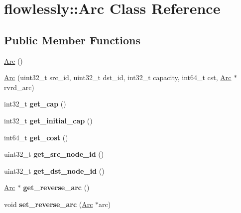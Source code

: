 \hypertarget{classflowlessly_1_1Arc}{\section{flowlessly\-:\-:\-Arc \-Class \-Reference}
\label{classflowlessly_1_1Arc}
}
\subsection*{\-Public \-Member \-Functions}
\begin{DoxyCompactItemize}
\item 
\hyperlink{classflowlessly_1_1Arc_a6b27244591ca37a631ea298c438e1ac9}{\-Arc} ()
\item 
\hyperlink{classflowlessly_1_1Arc_a20ca085211022fddf3605ac3e7b356e9}{\-Arc} (uint32\-\_\-t src\-\_\-id, uint32\-\_\-t dst\-\_\-id, int32\-\_\-t capacity, int64\-\_\-t cst, \hyperlink{classflowlessly_1_1Arc}{\-Arc} $\ast$rvrd\-\_\-arc)
\item 
\hypertarget{classflowlessly_1_1Arc_adf578a5770a7386bd427dbecab204ed6}{int32\-\_\-t {\bfseries get\-\_\-cap} ()}\label{classflowlessly_1_1Arc_adf578a5770a7386bd427dbecab204ed6}

\item 
\hypertarget{classflowlessly_1_1Arc_a7f46082f8862dd7980b337d7ecc8d66e}{int32\-\_\-t {\bfseries get\-\_\-initial\-\_\-cap} ()}\label{classflowlessly_1_1Arc_a7f46082f8862dd7980b337d7ecc8d66e}

\item 
\hypertarget{classflowlessly_1_1Arc_ac449e60052512ee03f4422c810494285}{int64\-\_\-t {\bfseries get\-\_\-cost} ()}\label{classflowlessly_1_1Arc_ac449e60052512ee03f4422c810494285}

\item 
\hypertarget{classflowlessly_1_1Arc_a3d1ece402eb38d52f5086e94094e8673}{uint32\-\_\-t {\bfseries get\-\_\-src\-\_\-node\-\_\-id} ()}\label{classflowlessly_1_1Arc_a3d1ece402eb38d52f5086e94094e8673}

\item 
\hypertarget{classflowlessly_1_1Arc_a8e05f7d49e27e1345039482713072905}{uint32\-\_\-t {\bfseries get\-\_\-dst\-\_\-node\-\_\-id} ()}\label{classflowlessly_1_1Arc_a8e05f7d49e27e1345039482713072905}

\item 
\hypertarget{classflowlessly_1_1Arc_a8e1aa09d1edf15b9340d48f1a60c401e}{\hyperlink{classflowlessly_1_1Arc}{\-Arc} $\ast$ {\bfseries get\-\_\-reverse\-\_\-arc} ()}\label{classflowlessly_1_1Arc_a8e1aa09d1edf15b9340d48f1a60c401e}

\item 
\hypertarget{classflowlessly_1_1Arc_ac6f5ffccf5f6ac4b31d55178f9a72abe}{void {\bfseries set\-\_\-reverse\-\_\-arc} (\hyperlink{classflowlessly_1_1Arc}{\-Arc} $\ast$arc)}\label{classflowlessly_1_1Arc_ac6f5ffccf5f6ac4b31d55178f9a72abe}

\end{DoxyCompactItemize}
